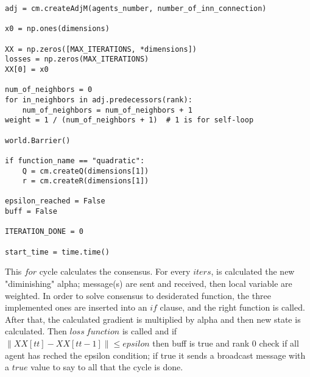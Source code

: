 \documentclass[a4paper,11pt,oneside]{book}
\begin{document}
\begin{lstlisting}
adj = cm.createAdjM(agents_number, number_of_inn_connection)

x0 = np.ones(dimensions)

XX = np.zeros([MAX_ITERATIONS, *dimensions])
losses = np.zeros(MAX_ITERATIONS)
XX[0] = x0

num_of_neighbors = 0
for in_neighbors in adj.predecessors(rank):
    num_of_neighbors = num_of_neighbors + 1
weight = 1 / (num_of_neighbors + 1)  # 1 is for self-loop

world.Barrier()

if function_name == "quadratic":
    Q = cm.createQ(dimensions[1])
    r = cm.createR(dimensions[1])

epsilon_reached = False
buff = False

ITERATION_DONE = 0

start_time = time.time()
\end{lstlisting}

This $for$ cycle calculates the consensus. For every $iters$, is calculated the new "diminishing" alpha; message(s) are sent and received, then
local variable are weighted. In order to solve consensus to desiderated function, the three implemented ones are inserted into an $if$ clause, and the
right function is called. After that, the calculated gradient is multiplied by alpha and then new state is calculated. Then $loss \
function$ is called and if $\left\lVert XX[tt] - XX[tt-1] \right\rVert \leq epsilon$ then buff is true and rank 0 check if all agent has reched the
epsilon condition; if true it sends a broadcast message with a $true$ value to say to all that the cycle is done.
\end{document}
